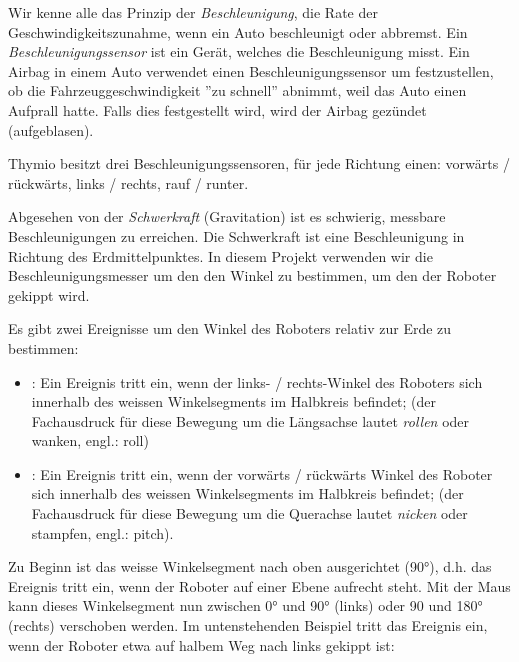 \label{ch.angles}

Wir kenne alle das Prinzip der \emph{Beschleunigung}, die Rate der Geschwindigkeitszunahme, wenn ein Auto beschleunigt oder abbremst. Ein
\emph{Beschleunigungssensor} ist ein Gerät, welches die Beschleunigung misst. Ein Airbag in einem Auto verwendet einen Beschleunigungssensor um festzustellen, ob die Fahrzeuggeschwindigkeit ''zu schnell'' abnimmt, weil das Auto einen Aufprall hatte. Falls dies festgestellt wird, wird der Airbag gezündet (aufgeblasen).

Thymio besitzt drei Beschleunigungssensoren, für jede Richtung einen: 
vorwärts / rückwärts, links / rechts, rauf / runter. 


Abgesehen von der \emph{Schwerkraft} (Gravitation) ist es schwierig, messbare Beschleunigungen zu erreichen. Die Schwerkraft ist eine Beschleunigung in Richtung des Erdmittelpunktes. In diesem Projekt verwenden wir die Beschleunigungsmesser um den den Winkel zu bestimmen, um den der Roboter gekippt wird.

Es gibt zwei Ereignisse um den Winkel des Roboters relativ zur Erde zu bestimmen:\label{p.accel}

\begin{itemize}

\item {}: Ein Ereignis tritt ein, wenn der links- / rechts-Winkel des Roboters sich innerhalb des weissen Winkelsegments im Halbkreis befindet; (der Fachausdruck für diese Bewegung um die Längsachse lautet \emph{rollen} oder wanken, engl.: roll)

\item {}: Ein Ereignis tritt ein, wenn der vorwärts / rückwärts Winkel des Roboter sich innerhalb des weissen Winkelsegments im Halbkreis befindet; (der Fachausdruck für diese Bewegung um die Querachse lautet \emph{nicken} oder stampfen, engl.: pitch).

\end{itemize}

Zu Beginn ist das weisse Winkelsegment nach oben ausgerichtet (90°), d.h. das Ereignis tritt ein, wenn der Roboter auf einer Ebene aufrecht steht. Mit der Maus kann dieses Winkelsegment nun zwischen 0° und 90° (links) oder 90 und 180° (rechts) verschoben werden. Im untenstehenden Beispiel tritt das Ereignis ein, wenn der Roboter
etwa auf halbem Weg nach links gekippt ist: 

